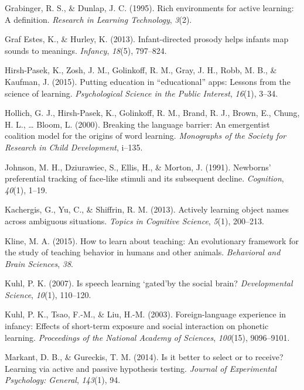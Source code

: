 \documentclass[a4paper,man,apacite,floatsintext]{apa6}
\begin{document}
\hypertarget{ref-grabinger1995rich}{}
Grabinger, R. S., \& Dunlap, J. C. (1995). Rich environments for active
learning: A definition. \emph{Research in Learning Technology},
\emph{3}(2).

\hypertarget{ref-graf2013infant}{}
Graf Estes, K., \& Hurley, K. (2013). Infant-directed prosody helps
infants map sounds to meanings. \emph{Infancy}, \emph{18}(5), 797--824.

\hypertarget{ref-hirsh2015putting}{}
Hirsh-Pasek, K., Zosh, J. M., Golinkoff, R. M., Gray, J. H., Robb, M.
B., \& Kaufman, J. (2015). Putting education in ``educational'' apps:
Lessons from the science of learning. \emph{Psychological Science in the
Public Interest}, \emph{16}(1), 3--34.

\hypertarget{ref-hollich2000breaking}{}
Hollich, G. J., Hirsh-Pasek, K., Golinkoff, R. M., Brand, R. J., Brown,
E., Chung, H. L., \ldots{} Bloom, L. (2000). Breaking the language
barrier: An emergentist coalition model for the origins of word
learning. \emph{Monographs of the Society for Research in Child
Development}, i--135.

\hypertarget{ref-johnson1991newborns}{}
Johnson, M. H., Dziurawiec, S., Ellis, H., \& Morton, J. (1991).
Newborns' preferential tracking of face-like stimuli and its subsequent
decline. \emph{Cognition}, \emph{40}(1), 1--19.

\hypertarget{ref-kachergis2013actively}{}
Kachergis, G., Yu, C., \& Shiffrin, R. M. (2013). Actively learning
object names across ambiguous situations. \emph{Topics in Cognitive
Science}, \emph{5}(1), 200--213.

\hypertarget{ref-kline2015learn}{}
Kline, M. A. (2015). How to learn about teaching: An evolutionary
framework for the study of teaching behavior in humans and other
animals. \emph{Behavioral and Brain Sciences}, \emph{38}.

\hypertarget{ref-kuhl2007speech}{}
Kuhl, P. K. (2007). Is speech learning `gated'by the social brain?
\emph{Developmental Science}, \emph{10}(1), 110--120.

\hypertarget{ref-kuhl2003foreign}{}
Kuhl, P. K., Tsao, F.-M., \& Liu, H.-M. (2003). Foreign-language
experience in infancy: Effects of short-term exposure and social
interaction on phonetic learning. \emph{Proceedings of the National
Academy of Sciences}, \emph{100}(15), 9096--9101.

\hypertarget{ref-markant2014better}{}
Markant, D. B., \& Gureckis, T. M. (2014). Is it better to select or to
receive? Learning via active and passive hypothesis testing.
\emph{Journal of Experimental Psychology: General}, \emph{143}(1), 94.
\end{document}
